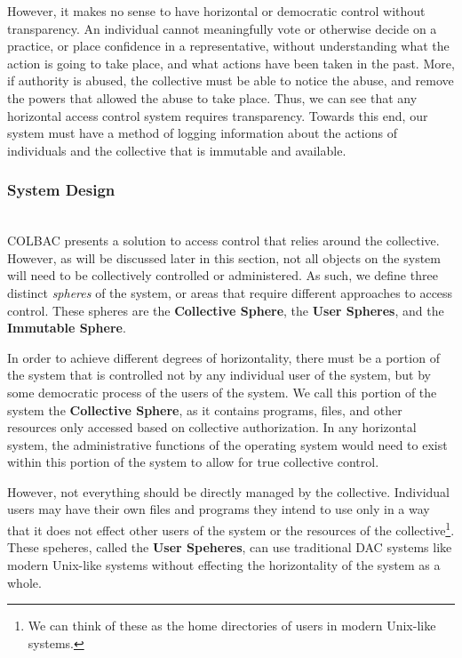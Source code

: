 However, it makes no sense to have horizontal or democratic control without
transparency. An individual cannot meaningfully vote or otherwise decide on a
practice, or place confidence in a representative, without understanding what
the action is going to take place, and what actions have been taken in the past.
More, if authority is abused, the collective must be able to notice the abuse,
and remove the powers that allowed the abuse to take place. Thus, we can see
that any horizontal access control system requires transparency. Towards this
end, our system must have a method of logging information about the actions of
individuals and the collective that is immutable and available.

\subsubsection{System Design}
\mbox{}\\
COLBAC presents a solution to access control that relies around the collective.
However, as will be discussed later in this section, not all objects on the
system will need to be collectively controlled or administered. As such, we
define three distinct \textit{spheres} of the system, or areas that require
different approaches to access control. These spheres are the \textbf{Collective
Sphere}, the \textbf{User Spheres}, and the \textbf{Immutable Sphere}.

In order to achieve different degrees of horizontality, there must be a portion
of the system that is controlled not by any individual user of the system, but
by some democratic process of the users of the system. We call this portion of
the system the \textbf{Collective Sphere}, as it contains programs, files, and
other resources only accessed based on collective authorization. In any
horizontal system, the administrative functions of the operating system would
need to exist within this portion of the system to allow for true collective
control.

However, not everything should be directly managed by the collective. Individual
users may have their own files and programs they intend to use only in a way
that it does not effect other users of the system or the resources of the
collective\footnote{We can think of these as the home directories of users in
modern Unix-like systems.}. These speheres, called the \textbf{User Speheres},
can use traditional DAC systems like modern Unix-like systems without effecting
the horizontality of the system as a whole.

